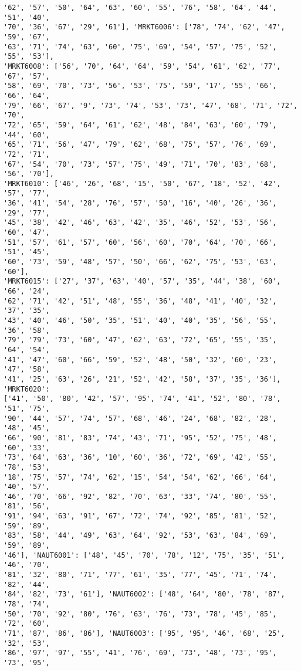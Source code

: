 \documentclass[11pt]{article}
\begin{document}
\begin{Verbatim}[commandchars=\\\{\}]
'62', '57', '50', '64', '63', '60', '55', '76', '58', '64', '44', '51', '40',
'70', '36', '67', '29', '61'], 'MRKT6006': ['78', '74', '62', '47', '59', '67',
'63', '71', '74', '63', '60', '75', '69', '54', '57', '75', '52', '55', '53'],
'MRKT6008': ['56', '70', '64', '64', '59', '54', '61', '62', '77', '67', '57',
'58', '69', '70', '73', '56', '53', '75', '59', '17', '55', '66', '66', '64',
'79', '66', '67', '9', '73', '74', '53', '73', '47', '68', '71', '72', '70',
'72', '65', '59', '64', '61', '62', '48', '84', '63', '60', '79', '44', '60',
'65', '71', '56', '47', '79', '62', '68', '75', '57', '76', '69', '72', '71',
'67', '54', '70', '73', '57', '75', '49', '71', '70', '83', '68', '56', '70'],
'MRKT6010': ['46', '26', '68', '15', '50', '67', '18', '52', '42', '57', '77',
'36', '41', '54', '28', '76', '57', '50', '16', '40', '26', '36', '29', '77',
'45', '38', '42', '46', '63', '42', '35', '46', '52', '53', '56', '60', '47',
'51', '57', '61', '57', '60', '56', '60', '70', '64', '70', '66', '51', '45',
'60', '73', '59', '48', '57', '50', '66', '62', '75', '53', '63', '60'],
'MRKT6015': ['27', '37', '63', '40', '57', '35', '44', '38', '60', '66', '24',
'62', '71', '42', '51', '48', '55', '36', '48', '41', '40', '32', '37', '35',
'43', '40', '46', '50', '35', '51', '40', '40', '35', '56', '55', '36', '58',
'79', '79', '73', '60', '47', '62', '63', '72', '65', '55', '35', '64', '54',
'41', '47', '60', '66', '59', '52', '48', '50', '32', '60', '23', '47', '58',
'41', '25', '63', '26', '21', '52', '42', '58', '37', '35', '36'], 'MRKT6020':
['41', '50', '80', '42', '57', '95', '74', '41', '52', '80', '78', '51', '75',
'90', '44', '57', '74', '57', '68', '46', '24', '68', '82', '28', '48', '45',
'66', '90', '81', '83', '74', '43', '71', '95', '52', '75', '48', '60', '33',
'73', '64', '63', '36', '10', '60', '36', '72', '69', '42', '55', '78', '53',
'18', '75', '57', '74', '62', '15', '54', '54', '62', '66', '64', '40', '57',
'46', '70', '66', '92', '82', '70', '63', '33', '74', '80', '55', '81', '56',
'91', '94', '63', '91', '67', '72', '74', '92', '85', '81', '52', '59', '89',
'83', '58', '44', '49', '63', '64', '92', '53', '63', '84', '69', '59', '89',
'46'], 'NAUT6001': ['48', '45', '70', '78', '12', '75', '35', '51', '46', '70',
'81', '32', '80', '71', '77', '61', '35', '77', '45', '71', '74', '82', '44',
'84', '82', '73', '61'], 'NAUT6002': ['48', '64', '80', '78', '87', '78', '74',
'50', '70', '92', '80', '76', '63', '76', '73', '78', '45', '85', '72', '60',
'71', '87', '86', '86'], 'NAUT6003': ['95', '95', '46', '68', '25', '32', '53',
'86', '97', '97', '55', '41', '76', '69', '73', '48', '73', '95', '73', '95',

\end{Verbatim}
\end{document}
